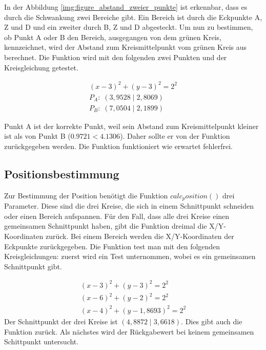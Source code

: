 In der Abbildung \ref{img:figure_abstand_zweier_punkte} ist erkennbar, dass es durch die Schwankung zwei Bereiche gibt. Ein Bereich ist durch die Eckpunkte \si{A}, \si{Z} und \si{D} und ein zweiter durch \si{B}, \si{Z} und \si{D} abgesteckt. Um nun zu bestimmen, ob Punkt \si{A} oder \si{B} den Bereich, ausgegangen von dem grünen Kreis, kennzeichnet, wird der Abstand zum Kreismittelpunkt vom grünen Kreis aus berechnet. Die Funktion wird mit den folgenden zwei Punkten und der Kreisgleichung getestet.

\begin{equation*}
\label{eq:unit_test_abstand_zweier_punkte}
\begin{split}
(x - 3)^{2} + (y - 3)^{2} = 2^{2}\\
P_{A}: \; (3,9528 \;|\; 2,8069)\\
P_{B}: \; (7,0504 \;|\; 2,1899)
\end{split}
\end{equation*}

Punkt \si{A} ist der korrekte Punkt, weil sein Abstand zum Kreismittelpunkt kleiner ist als von Punkt \si{B} ($0.9721 < 4.1306$). Daher sollte er von der Funktion zurückgegeben werden. Die Funktion funktioniert wie erwartet fehlerfrei.

\subsection{Positionsbestimmung}
Zur Bestimmung der Position benötigt die Funktion $calc_position()$ drei Parameter. Diese sind die drei Kreise, die sich in einem Schnittpunkt schneiden oder einen Bereich aufspannen. Für den Fall, dass alle drei Kreise einen gemeinsamen Schnittpunkt haben, gibt die Funktion dreimal die X/Y-Koordinaten zurück. Bei einem Bereich werden die X/Y-Koordinaten der Eckpunkte zurückgegeben. Die Funktion test man mit den folgenden Kreisgleichungen: zuerst wird ein Test unternommen, wobei es ein gemeinsamen Schnittpunkt gibt.

\begin{equation*}
\label{eq:unit_test_positionsbestimmung}
\begin{split}
(x - 3)^{2} + (y - 3)^{2} = 2^{2} \\
(x - 6)^{2} + (y - 2)^{2} = 2^{2} \\
(x - 4)^{2} + (y - 1,8693)^{2} = 2^{2}
\end{split}
\end{equation*}
Der Schnittpunkt der drei Kreise ist $( 4,8872 \;|\; 3,6618)$. Dies gibt auch die Funktion zurück. Als nächstes wird der Rückgabewert bei keinem gemeinsamen Schittpunkt untersucht.

